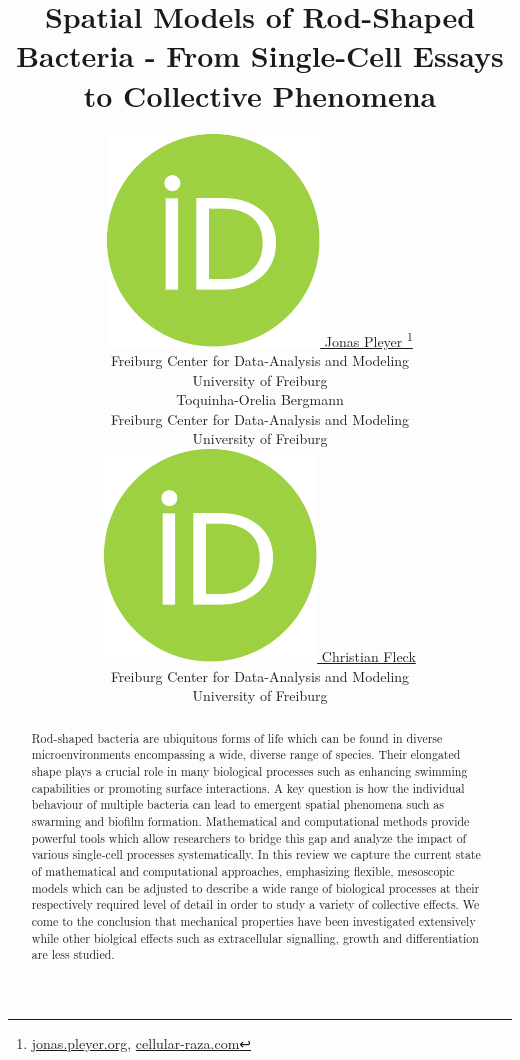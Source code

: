 \documentclass{article}
\title{Spatial Models of Rod-Shaped Bacteria - From Single-Cell Essays to Collective Phenomena}
\author{
    \href{https://orcid.org/0009-0001-0613-7978}{
        \includegraphics[scale=0.06]{orcid.pdf}
        \hspace{1mm}Jonas Pleyer
    }
    \thanks{
        \href{https://jonas.pleyer.org}{jonas.pleyer.org},
        \href{https://cellular-raza.com}{cellular-raza.com}
    }\\
	Freiburg Center for Data-Analysis and Modeling\\
	University of Freiburg\\
	\And
    \hspace{1mm}Toquinha-Orelia Bergmann\\
	Freiburg Center for Data-Analysis and Modeling\\
	University of Freiburg\\
	\And
	\href{https://orcid.org/0000-0002-6371-4495}{
        \includegraphics[scale=0.06]{orcid.pdf}
        \hspace{1mm}Christian Fleck
    }\\
	Freiburg Center for Data-Analysis and Modeling\\
	University of Freiburg
}
\begin{document}
\maketitle


\begin{abstract}
    Rod-shaped bacteria are ubiquitous forms of life which can be found in diverse microenvironments
    encompassing a wide, diverse range of species.
    Their elongated shape plays a crucial role in many biological processes such as enhancing
    swimming capabilities or promoting surface interactions.
    A key question is how the individual behaviour of multiple bacteria can lead to emergent
    spatial phenomena such as swarming and biofilm formation.
    Mathematical and computational methods provide powerful tools which allow researchers to bridge
    this gap and analyze the impact of various single-cell processes systematically.
    In this review we capture the current state of mathematical and computational approaches,
    emphasizing flexible, mesoscopic models which can be adjusted to describe a wide range of
    biological processes at their respectively required level of detail in order to study a variety
    of collective effects.
    We come to the conclusion that mechanical properties have been investigated extensively while
    other biolgical effects such as extracellular signalling, growth and differentiation are less
    studied.
\end{abstract}
\end{document}
